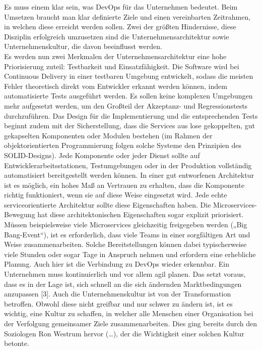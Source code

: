 Es muss einem klar sein, was DevOps für das Unternehmen bedeutet. Beim Umsetzen braucht man klar definierte Ziele und einen vereinbarten Zeitrahmen, in welchen diese erreicht werden sollen. Zwei der größten Hindernisse, diese Disziplin erfolgreich umzusetzen sind die Unternehmensarchitektur sowie Unternehmenskultur, die davon beeinflusst werden.\\Es werden nun zwei Merkmalen der Unternehmensarchitektur eine hohe Priorisierung zuteil: Testbarkeit und Einsatzfähigkeit. Die Software wird bei Continuous Delivery in einer testbaren Umgebung entwickelt, sodass die meisten Fehler theoretisch direkt vom Entwickler erkannt werden können, indem automatisierte Tests ausgeführt werden. Es sollen keine komplexen Umgebungen mehr aufgesetzt werden, um den Großteil der Akzeptanz- und Regressionstests durchzuführen. Das Design für die Implementierung und die entsprechenden Tests beginnt zudem mit der Sicherstellung, dass die Services aus lose gekoppelten, gut gekapselten Komponenten oder Modulen bestehen (im Rahmen der objektorientierten Programmierung folgen solche Systeme den Prinzipien des SOLID-Designs). Jede Komponente oder jeder Dienst sollte auf Entwicklerarbeitsstationen, Testumgebungen oder in der Produktion vollständig automatisiert bereitgestellt werden können. In einer gut entworfenen Architektur ist es möglich, ein hohes Maß an Vertrauen zu erhalten, dass die Komponente richtig funktioniert, wenn sie auf diese Weise eingesetzt wird. Jede echte serviceorientierte Architektur sollte diese Eigenschaften haben. Die Microservices-Bewegung hat diese architektonischen Eigenschaften sogar explizit priorisiert. Müssen beispielsweise viele Microservices gleichzeitig freigegeben werden („Big Bang-Event“), ist es erforderlich, dass viele Teams in einer sorgfältigen Art und Weise zusammenarbeiten. Solche Bereitstellungen können dabei typischerweise viele Stunden oder sogar Tage in Anspruch nehmen und erfordern eine erhebliche Planung. Auch hier ist die Verbindung zu DevOps wieder erkennbar. Ein Unternehmen muss kontinuierlich und vor allem agil planen. Das setzt voraus, dass es in der Lage ist, sich schnell an die sich ändernden Marktbedingungen anzupassen [3]. 
Auch die Unternehmenskultur ist von der Transformation betroffen. Obwohl diese nicht greifbar und nur schwer zu ändern ist, ist es wichtig, eine Kultur zu schaffen, in welcher alle Menschen einer Organisation bei der Verfolgung gemeinsamer Ziele zusammenarbeiten. Dies ging bereits durch den Soziologen Ron Westrum hervor (…), der die Wichtigkeit einer solchen Kultur betonte.
